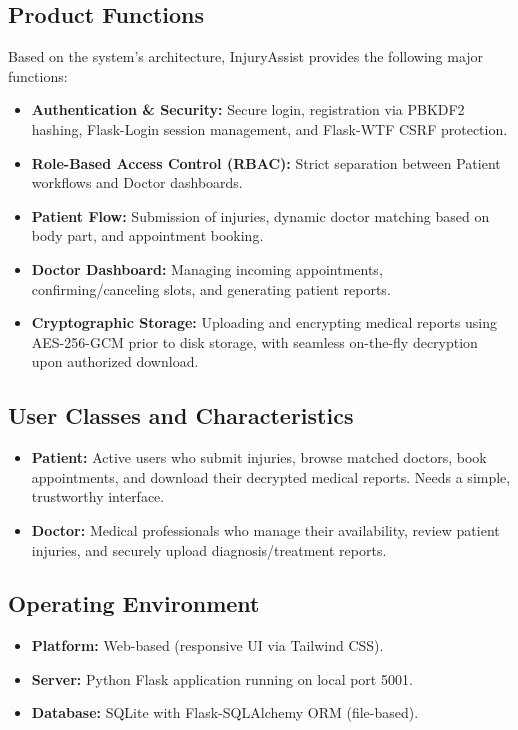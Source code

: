 \documentclass[11pt,a4paper]{article}
\begin{document}
\subsection{Product Functions}
Based on the system's architecture, InjuryAssist provides the following major functions:
\begin{itemize}
    \item \textbf{Authentication \& Security:} Secure login, registration via PBKDF2 hashing, Flask-Login session management, and Flask-WTF CSRF protection.
    \item \textbf{Role-Based Access Control (RBAC):} Strict separation between Patient workflows and Doctor dashboards.
    \item \textbf{Patient Flow:} Submission of injuries, dynamic doctor matching based on body part, and appointment booking.
    \item \textbf{Doctor Dashboard:} Managing incoming appointments, confirming/canceling slots, and generating patient reports.
    \item \textbf{Cryptographic Storage:} Uploading and encrypting medical reports using AES-256-GCM prior to disk storage, with seamless on-the-fly decryption upon authorized download.
\end{itemize}

\subsection{User Classes and Characteristics}
\begin{itemize}
    \item \textbf{Patient:} Active users who submit injuries, browse matched doctors, book appointments, and download their decrypted medical reports. Needs a simple, trustworthy interface.
    \item \textbf{Doctor:} Medical professionals who manage their availability, review patient injuries, and securely upload diagnosis/treatment reports.
\end{itemize}

\subsection{Operating Environment}
\begin{itemize}
    \item \textbf{Platform:} Web-based (responsive UI via Tailwind CSS).
    \item \textbf{Server:} Python Flask application running on local port 5001.
    \item \textbf{Database:} SQLite with Flask-SQLAlchemy ORM (file-based).
\end{itemize}
\end{document}
